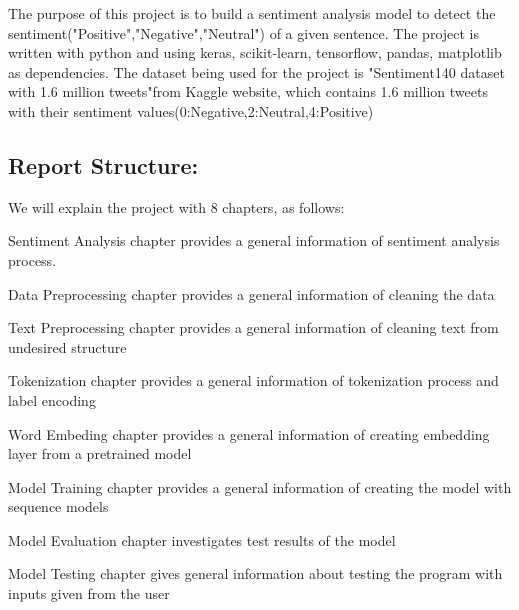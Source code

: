 

    The purpose of this project is to build a sentiment analysis model to detect the sentiment("Positive","Negative","Neutral") of a given sentence. The project is written with python and using
    keras, scikit-learn, tensorflow, pandas, matplotlib as dependencies. The dataset being used for the project is "Sentiment140 dataset with 1.6 million tweets"from Kaggle website, which contains 1.6 million tweets with their sentiment values(0:Negative,2:Neutral,4:Positive)


\subsection*{Report Structure:}
We will explain the project with 8 chapters, as follows:
\vspace{0.4 cm}
\par Sentiment Analysis chapter provides a general information of sentiment analysis process. \par
\par Data Preprocessing chapter provides a general information of cleaning the data \par
Text Preprocessing chapter  provides a general information of cleaning text from undesired structure  \par
Tokenization chapter  provides a general information of tokenization process and label encoding  \par
Word Embeding chapter  provides a general information of creating embedding layer from a pretrained model \par
Model Training chapter provides a general information of creating the model with sequence models \par
Model Evaluation chapter investigates test results of the model \par
Model Testing chapter gives general information about testing the program with inputs given from the user \par